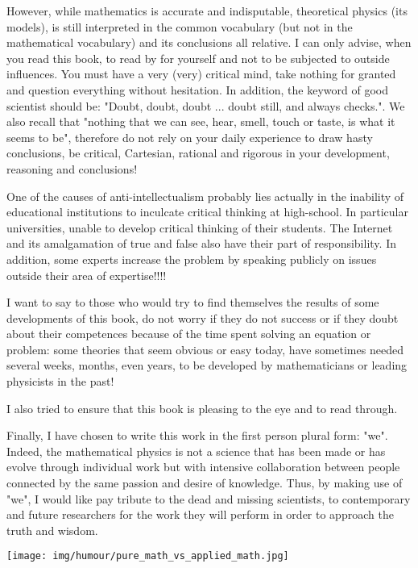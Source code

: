 	However, while mathematics is accurate and indisputable, theoretical physics (its models), is still interpreted in the common vocabulary (but not in the mathematical vocabulary) and its conclusions all relative. I can only advise, when you read this book, to read by for yourself and not to be subjected to outside influences. You must have a very (very) critical mind, take nothing for granted and question everything without hesitation. In addition, the keyword of good scientist should be: "Doubt, doubt, doubt ... doubt still, and always checks.". We also recall that "nothing that we can see, hear, smell, touch or taste, is what it seems to be", therefore do not rely on your daily experience to draw hasty conclusions, be critical, Cartesian, rational and rigorous in your development, reasoning and conclusions!
	\begin{tcolorbox}[title=Remark,colframe=black,arc=10pt]
	One of the causes of anti-intellectualism probably lies actually in the inability of educational institutions to inculcate critical thinking at high-school. In particular universities, unable to develop critical thinking of their students. The Internet and its amalgamation of true and false also have their part of responsibility. In addition, some experts increase the problem by speaking publicly on issues outside their area of expertise!!!!
	\end{tcolorbox}
	I want to say to those who would try to find themselves the results of some developments of this book, do not worry if they do not success or if they doubt about their competences because of the time spent solving an equation or problem: some theories that seem obvious or easy today, have sometimes needed several weeks, months, even years, to be developed by mathematicians or leading physicists in the past!
	
	I also tried to ensure that this book is pleasing to the eye and to read through.
	
	Finally, I have chosen to write this work in the first person plural form: "we". Indeed, the mathematical physics is not a science that has been made or has evolve through individual work but with intensive collaboration between people connected by the same passion and desire of knowledge. Thus, by making use of "we", I would like pay tribute to the dead and missing scientists, to contemporary and future researchers for the work they will perform in order to approach the truth and wisdom.
	
	\begin{center}
	\texttt{[image: img/humour/pure\_math\_vs\_applied\_math.jpg]}
	\end{center}

